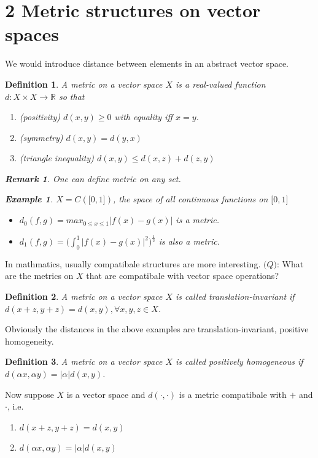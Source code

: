 \documentclass{article}
\newtheorem*{definition}{Definition}
\newtheorem*{remark}{Remark}
\newtheorem*{example}{Example}
\begin{document}
\section*{2 Metric structures on vector spaces}
We would introduce distance between elements in an abstract vector space.
\begin{definition}
    A metric on a vector space $X$ is a real-valued function $d: X \times X \rightarrow \mathbb{R}$ so that
    \begin{enumerate}
        \item (positivity) $d(x, y)\ge0$ with equality iff $x=y$.
        \item (symmetry) $d(x, y)=d(y, x)$
        \item (triangle inequality) $d(x, y) \le d(x, z) + d(z, y)$
    \end{enumerate}
    \begin{remark}
        One can define metric on any set.
    \end{remark}
    \begin{example}
        $X=C(\bigl[0, 1\bigr])$, the space of all continuous functions on $\bigl[0, 1\bigr]$
        \begin{itemize}
            \item $d_0(f, g) = max_{0 \le x \le 1}|f(x) - g(x)|$ is a metric.
            \item $d_1(f, g) = \bigl(\int_{0}^{1}{|f(x) - g(x)|^2}\bigr)^\frac{1}{2}$ is also a metric.
        \end{itemize}
    \end{example}
\end{definition}
In mathmatics, usually compatibale structures are more interesting.
$\mathbb(Q)$: What are the metrics on $X$ that are compatibale with vector space operations?
\begin{definition}
    A metric on a vector space $X$ is called translation-invariant if 
    $d(x + z, y + z) = d(x, y), \forall x, y, z \in X$.
\end{definition}
Obviously the distances in the above examples are translation-invariant, positive homogeneity.
\begin{definition}
    A metric on a vector space $X$ is called positively homogeneous if
    $d(\alpha x, \alpha y) = |\alpha|d(x, y)$.
\end{definition}
Now suppose $X$ is a vector space and $d(\cdot, \cdot)$ is a metric compatibale 
with $+$ and $\cdot$, i.e.
\begin{enumerate}[label=\alph*)]
    \item $d(x + z, y + z) = d(x, y)$
    \item $d(\alpha x, \alpha y) = |\alpha|d(x, y)$
\end{enumerate}
\end{document}
